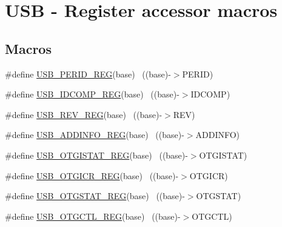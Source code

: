 \hypertarget{group___u_s_b___register___accessor___macros}{}\section{U\+SB -\/ Register accessor macros}
\label{group___u_s_b___register___accessor___macros}
\subsection*{Macros}
\begin{DoxyCompactItemize}
\item 
\#define \hyperlink{group___u_s_b___register___accessor___macros_gaf7ac61d8729d7357b45ebb18042334e5}{U\+S\+B\+\_\+\+P\+E\+R\+I\+D\+\_\+\+R\+EG}(base)                                        ~((base)-\/$>$P\+E\+R\+ID)
\item 
\#define \hyperlink{group___u_s_b___register___accessor___macros_ga4ea3ccb3fd6a83a960e21b2a07fa78a4}{U\+S\+B\+\_\+\+I\+D\+C\+O\+M\+P\+\_\+\+R\+EG}(base)                                      ~((base)-\/$>$I\+D\+C\+O\+MP)
\item 
\#define \hyperlink{group___u_s_b___register___accessor___macros_gab7585eeb9bce74c027e9c8de01789e66}{U\+S\+B\+\_\+\+R\+E\+V\+\_\+\+R\+EG}(base)                                            ~((base)-\/$>$R\+EV)
\item 
\#define \hyperlink{group___u_s_b___register___accessor___macros_gad4babec546f000e557c561d031504513}{U\+S\+B\+\_\+\+A\+D\+D\+I\+N\+F\+O\+\_\+\+R\+EG}(base)                                    ~((base)-\/$>$A\+D\+D\+I\+N\+FO)
\item 
\#define \hyperlink{group___u_s_b___register___accessor___macros_gad864de812bd346fc2c67bb93e75de5bb}{U\+S\+B\+\_\+\+O\+T\+G\+I\+S\+T\+A\+T\+\_\+\+R\+EG}(base)                                  ~((base)-\/$>$O\+T\+G\+I\+S\+T\+AT)
\item 
\#define \hyperlink{group___u_s_b___register___accessor___macros_gabb95027a64757ad6dd1ede1d71e5189e}{U\+S\+B\+\_\+\+O\+T\+G\+I\+C\+R\+\_\+\+R\+EG}(base)                                      ~((base)-\/$>$O\+T\+G\+I\+CR)
\item 
\#define \hyperlink{group___u_s_b___register___accessor___macros_ga32e34f54ace5fad23a69c81cab333ca1}{U\+S\+B\+\_\+\+O\+T\+G\+S\+T\+A\+T\+\_\+\+R\+EG}(base)                                    ~((base)-\/$>$O\+T\+G\+S\+T\+AT)
\item 
\#define \hyperlink{group___u_s_b___register___accessor___macros_ga06fe688c6865edd89882b91cc194330d}{U\+S\+B\+\_\+\+O\+T\+G\+C\+T\+L\+\_\+\+R\+EG}(base)                                      ~((base)-\/$>$O\+T\+G\+C\+TL)

\end{DoxyCompactItemize}
